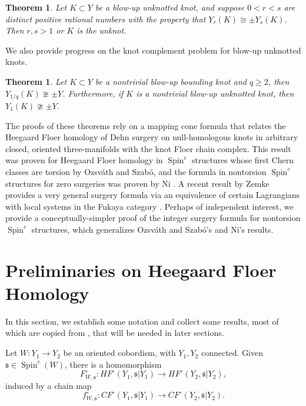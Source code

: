 \documentclass{article}
\newtheorem{theorem}[equation]{Theorem}
\theoremstyle{remark}
\numberwithin{equation}{section}
\numberwithin{table}{section}
\renewcommand{\frak}{\mathfrak}
\DeclareMathOperator{\Spin}{Spin}
\renewcommand{\(}{\left(}
\renewcommand{\)}{\right)}
\begin{document}
\begin{theorem}
Let $K\subset Y$ be a blow-up unknotted knot, and suppose $0<r<s$ are distinct positive rational numbers with the property that $Y_r(K)\cong\pm Y_s(K)$. Then $r,s>1$ or $K$ is the unknot. 
\end{theorem}

We also provide progress on the knot complement problem for blow-up unknotted knots.

\begin{theorem}
Let $K\subset Y$ be a nontrivial blow-up bounding knot and $q\ge 2$, then $Y_{1/q}(K)\ncong\pm Y$. Furthermore, if $K$ is a nontrivial blow-up unknotted knot, then $Y_1(K)\ncong\pm Y$. 
\end{theorem}

The proofs of these theorems rely on a mapping cone formula that relates the Heegaard Floer homology of Dehn surgery on null-homologous knots in arbitrary closed, oriented three-manifolds with the knot Floer chain complex. This result was proven for Heegaard Floer homology in $\Spin^c$ structures whose first Chern classes are torsion by Ozsv\'ath and Szab\'o, and the formula in nontorsion $\Spin^c$ structures for zero surgeries was proven by Ni \cite{oz-sz-integer,oz-sz-rational,ni-property-g}. A recent result by Zemke provides a very general surgery formula via an equivalence of certain Lagrangians with local systems in the Fukaya category \cite{zemke-hf-surgery-formula}. Perhaps of independent interest, we provide a conceptually-simpler proof of the integer surgery formula for nontorsion $\Spin^c$ structures, which generalizes Ozsv\'ath and Szab\'o's and Ni's results.












\section{Preliminaries on Heegaard Floer Homology}

In this section, we establish some notation and collect some results, most of which are copied from \cite{oz-sz-integer}, that will be needed in later sections.

Let $W:Y_1\to Y_2$ be an oriented cobordism, with $Y_1,Y_2$ connected. Given $\frak s\in\Spin^c(W)$, there is a homomorphism
$$F_{W,\frak s}^\circ: HF^\circ(Y_1,\frak s\vert Y_1)\to HF^\circ(Y_2,\frak s\vert Y_2),$$ induced by a chain map
$$f_{W,\frak s}^\circ: CF^\circ(Y_1,\frak s\vert Y_1)\to CF^\circ(Y_2,\frak s\vert Y_2).$$
\end{document}
